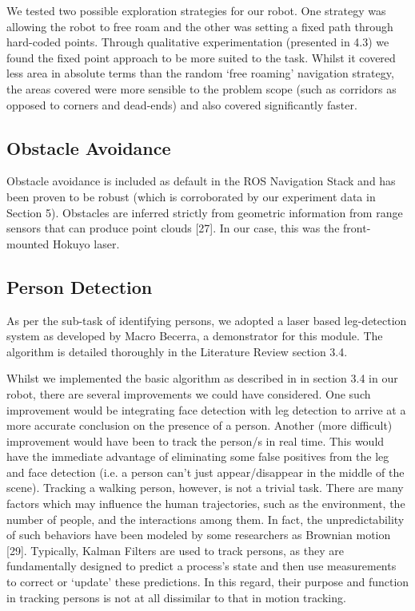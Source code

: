 \documentclass{article}
\begin{document}
\begin{multicols}{2}
We tested two possible exploration strategies for our robot. One strategy was allowing the robot to free roam and the other was setting a fixed path through hard-coded points. Through qualitative experimentation (presented in 4.3) we found the fixed point approach to be more suited to the task. Whilst it covered less area in absolute terms than the random ‘free roaming’ navigation strategy, the areas covered were more sensible to the problem scope (such as corridors as opposed to corners and dead-ends) and also covered significantly faster.

	\subsection{Obstacle Avoidance}
	Obstacle avoidance is included as default in the ROS Navigation Stack and has been proven to be robust (which is corroborated by our experiment data in Section 5). Obstacles are inferred strictly from geometric information from range sensors that can produce point clouds [27]. In our case, this was the front-mounted Hokuyo laser. 

	\subsection{Person Detection}
	As per the sub-task of identifying persons, we adopted a laser based leg-detection system as developed by Macro Becerra, a demonstrator for this module. The algorithm is detailed thoroughly in the Literature Review section 3.4.

Whilst we implemented the basic algorithm as described in in section 3.4 in our robot, there are several improvements we could have considered. One such improvement would be integrating face detection with leg detection to arrive at a more accurate conclusion on the presence of a person. Another (more difficult) improvement would have been to track the person/s in real time. This would have the immediate advantage of eliminating some false positives from the leg and face detection (i.e. a person can't just appear/disappear in the middle of the scene). Tracking a walking person, however, is not a trivial task. There are many factors which may influence the human trajectories, such as the environment, the number of people, and the interactions among them. In fact, the unpredictability of such behaviors have been modeled by some researchers as Brownian motion [29]. Typically, Kalman Filters are used to track persons, as they are fundamentally designed to predict a process’s state and then use measurements to correct or ‘update’ these predictions. In this regard, their purpose and function in tracking persons is not at all dissimilar to that in motion tracking.
\end{multicols}
\end{document}
